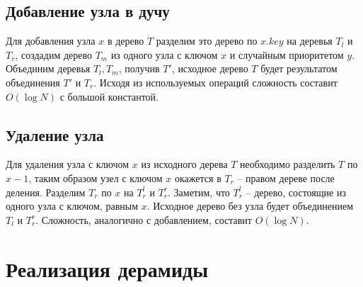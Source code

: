 \subsection*{Добавление узла в дучу}
Для добавления узла $x$ в дерево $T$ разделим это дерево по $x.key$ на деревья $T_l$ и $T_r$, создадим дерево $T_m$ из одного узла с ключом $x$ и случайным приоритетом $y$. Объединим деревья $T_l,T_m$, получив $T'$, исходное дерево $T$ будет результатом объединения $T'$ и $T_r$. Исходя из используемых операций сложность составит $O(\log{N})$ с большой константой.

\subsection*{Удаление  узла}
Для удаления узла с ключом $x$ из исходного дерева $T$ необходимо разделить $T$ по $x-1$, таким образом узел с ключом $x$ окажется в $T_r$ -- правом дереве после деления. Разделим $T_r$ по $x$ на $T^l_r$ и $T^r_r$. Заметим, что $T^l_r$ -- дерево, состоящие из одного узла с ключом, равным $x$. Исходное дерево без узла будет объединением $T_l$ и $T^r_r$. Сложность, аналогично с добавлением, составит $O(\log{N})$.

\section{Реализация дерамиды}

